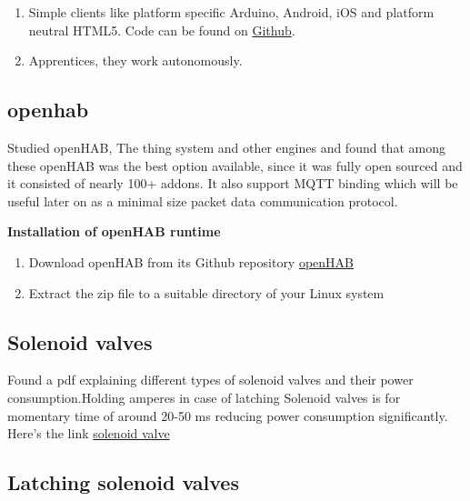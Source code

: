 \documentclass[16pt]{article}
\begin{document}
\begin{enumerate}


\item
  Simple clients like platform specific Arduino, Android, iOS and
  platform neutral HTML5. Code can be found on
  \href{https://github.com/TheThingSystem/steward/tree/master/clients/examples}{Github}.
\item
  Apprentices, they work autonomously.
  
\end{enumerate}

\subsection{openhab}


Studied openHAB, The thing system and other engines and found that among these openHAB was the best option available, since it was fully open sourced and it
consisted of nearly 100+ addons. It also support MQTT binding which will be useful later on as a minimal size packet data communication protocol.

\hfill

\textbf{Installation of openHAB runtime}

\begin{enumerate}

  \item Download openHAB from its Github repository \href{https://github.com/openhab}{openHAB}
  \item Extract the zip file to a suitable directory of your Linux system

\end{enumerate}

\subsection{Solenoid valves}

\vspace{0.3cm}

  Found a pdf explaining different types of solenoid valves and their
  power consumption.Holding amperes in case of latching Solenoid valves is
  for momentary time of around 20-50 ms reducing power consumption
  significantly. Here's the link \href{http://www.ascovalve.com/common/pdffiles/product/engineeringr5.pdf}{solenoid valve}

\vspace{0.3cm}

\subsection{Latching solenoid valves}
\end{document}
